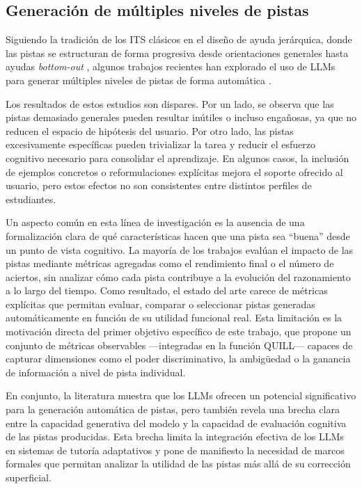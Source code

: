 \documentclass[../main.tex]{subfiles}
\begin{document}
\subsection{Generación de múltiples niveles de pistas}

Siguiendo la tradición de los ITS clásicos en el diseño de ayuda jerárquica, donde las pistas se estructuran de forma progresiva desde orientaciones generales hasta ayudas \textit{bottom-out} \cite{Aleven2016HelpDesign}, algunos trabajos recientes han explorado el uso de LLMs para generar múltiples niveles de pistas de forma automática \cite{tonga2024automaticgenerationquestionhints}.


Los resultados de estos estudios son dispares. Por un lado, se observa que las pistas demasiado generales pueden resultar inútiles o incluso engañosas, ya que no reducen el espacio de hipótesis del usuario. Por otro lado, las pistas excesivamente específicas pueden trivializar la tarea y reducir el esfuerzo cognitivo necesario para consolidar el aprendizaje. En algunos casos, la inclusión de ejemplos concretos o reformulaciones explícitas mejora el soporte ofrecido al usuario, pero estos efectos no son consistentes entre distintos perfiles de estudiantes.

Un aspecto común en esta línea de investigación es la ausencia de una formalización clara de qué características hacen que una pista sea “buena” desde un punto de vista cognitivo. La mayoría de los trabajos evalúan el impacto de las pistas mediante métricas agregadas como el rendimiento final o el número de aciertos, sin analizar cómo cada pista contribuye a la evolución del razonamiento a lo largo del tiempo. Como resultado, el estado del arte carece de métricas explícitas que permitan evaluar, comparar o seleccionar pistas generadas automáticamente en función de su utilidad funcional real. Esta limitación es la motivación directa del primer objetivo específico de este trabajo, que propone un conjunto de métricas observables —integradas en la función QUILL— capaces de capturar dimensiones como el poder discriminativo, la ambigüedad o la ganancia de información a nivel de pista individual.

En conjunto, la literatura muestra que los LLMs ofrecen un potencial significativo para la generación automática de pistas, pero también revela una brecha clara entre la capacidad generativa del modelo y la capacidad de evaluación cognitiva de las pistas producidas. Esta brecha limita la integración efectiva de los LLMs en sistemas de tutoría adaptativos y pone de manifiesto la necesidad de marcos formales que permitan analizar la utilidad de las pistas más allá de su corrección superficial.
\end{document}
